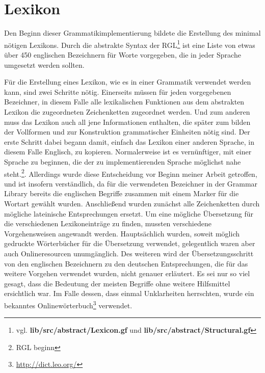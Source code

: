 \documentclass[12pt,abstract=on,titlepage,bibliography=totoc,ngerman,listof=totoc]{scrreprt}
\begin{document}
\section{Lexikon}
\label{sec:lexikon}
Den Beginn dieser Grammatikimplementierung bildete die Erstellung des minimal nötigen Lexikons. Durch die abstrakte Syntax der RGL\footnote{vgl. \textbf{lib/src/abstract/Lexicon.gf} und \textbf{lib/src/abstract/Structural.gf}} ist eine Liste von etwas über 450 englischen Bezeichnern für Worte vorgegeben, die in jeder Sprache umgesetzt werden sollten. \par
Für die Erstellung eines Lexikon, wie es in einer Grammatik verwendet werden kann, sind zwei Schritte nötig. Einerseits müssen für jeden vorgegebenen Bezeichner, in diesem Falle alle lexikalischen Funktionen aus dem abstrakten Lexikon die zugeordneten Zeichenketten zugeordnet werden. Und zum anderen muss das Lexikon auch all jene Informationen enthalten, die später zum bilden der Vollformen und zur Konstruktion grammatischer Einheiten nötig sind.
Der erste Schritt dabei begann damit, einfach das Lexikon einer anderen Sprache, in diesem Falle Englisch, zu kopieren. Normalerweise ist es vernünftiger, mit einer Sprache zu beginnen, die der zu implementierenden Sprache möglichst nahe steht.\footnote{RGL beginn}. Allerdings wurde diese Entscheidung vor Beginn meiner Arbeit getroffen, und ist insofern verständlich, da für die verwendeten Bezeichner in der Grammar Library bereits die englischen Begriffe zusammen mit einem Marker für die Wortart gewählt wurden. Anschließend wurden zunächst alle Zeichenketten durch mögliche lateinische Entsprechungen ersetzt. Um eine mögliche Übersetzung für die verschiedenen Lexikoneinträge zu finden, mussten verschiedene Vorgehensweisen angewandt werden. Hauptsächlich wurden, soweit möglich gedruckte Wörterbücher für die Übersetzung verwendet, gelegentlich waren aber auch Onlineresourcen unumgänglich. Des weiteren wird der Übersetzungsschritt von den englischen Bezeichnern zu den deutschen Entsprechungen, die für das weitere Vorgehen verwendet wurden, nicht genauer erläutert. Es sei nur so viel gesagt, dass die Bedeutung der meisten Begriffe ohne weitere Hilfsmittel ersichtlich war. Im Falle dessen, dass einmal Unklarheiten herrschten, wurde ein bekanntes Onlinewörterbuch\footnote{\url{http://dict.leo.org/}} verwendet.\par
\end{document}
